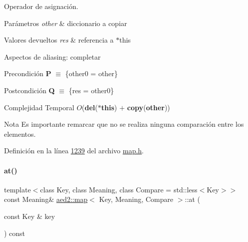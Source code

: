 Operador de asignación. 


\begin{DoxyParams}{Parámetros}
{\em other} & diccionario a copiar \\
\hline
\end{DoxyParams}

\begin{DoxyRetVals}{Valores devueltos}
{\em res} & referencia a $\ast$this\\
\hline
\end{DoxyRetVals}
\begin{DoxyParagraph}{Aspectos de aliasing\+:}
completar
\end{DoxyParagraph}
\begin{DoxyPrecond}{Precondición}
{\bfseries P} $\equiv$ \{other0 = other\} 
\end{DoxyPrecond}
\begin{DoxyPostcond}{Postcondición}
{\bfseries Q} $\equiv$ \{res = other0\}
\end{DoxyPostcond}

\begin{DoxyDescription}
\item[Complejidad Temporal]$O$({\bfseries del}({\bfseries $\ast$this}) $+$ {\bfseries copy}({\bfseries other}))
\end{DoxyDescription}

\begin{DoxyNote}{Nota}
Es importante remarcar que no se realiza ninguna comparación entre los elementos. 
\end{DoxyNote}


Definición en la línea \hyperlink{map_8h_source_l01239}{1239} del archivo \hyperlink{map_8h_source}{map.\+h}.

\mbox{\label{classaed2_1_1map_a579c9179b42175c23a1013ac7f1b876c_a579c9179b42175c23a1013ac7f1b876c}} 
\paragraph{\texorpdfstring{at()}{at()}\hspace{0.1cm}{\footnotesize\ttfamily [1/2]}}
{\footnotesize\ttfamily template$<$class Key, class Meaning, class Compare = std\+::less$<$\+Key$>$$>$ \\
const Meaning\& \hyperlink{classaed2_1_1map}{aed2\+::map}$<$ Key, Meaning, Compare $>$\+::at (\begin{DoxyParamCaption}\item[{const Key \&}]{key }\end{DoxyParamCaption}) const\hspace{0.3cm}{\ttfamily [inline]}}



